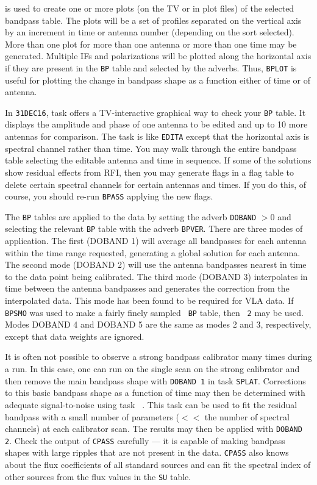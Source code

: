      {\tt {}} is used to create one or more plots (on the TV
or in plot files) of the selected bandpass table.  The plots will be a
set of profiles separated on the vertical axis by an increment in time
or antenna number (depending on the sort selected).  More than one
plot for more than one antenna or more than one time may be generated.
Multiple IFs and polarizations will be plotted along the horizontal
axis if they are present in the {\tt BP} table and selected by the
adverbs.  Thus, {\tt BPLOT} is useful for plotting the change in
bandpass shape as a function either of time or of antenna.

     In {\tt 31DEC16}, task {\tt {}} offers a TV-interactive
graphical way to check your {\tt BP} table.  It displays the amplitude
and phase of one antenna to be edited and up to 10 more antennas for
comparison.  The task is like {\tt EDITA} except that the horizontal
axis is spectral channel rather than time.  You may walk through the
entire bandpass table selecting the editable antenna and time in
sequence.  If some of the solutions show residual effects from RFI,
then you may generate flags in a flag table to delete certain spectral
channels for certain antennas and times.  If you do this, of course,
you should re-run {\tt BPASS} applying the new flags.

     The {\tt BP} tables are applied to the data by setting the adverb
{\tt DOBAND} $> 0$ and selecting the relevant {\tt BP} table with the
adverb \hbox{{\tt BPVER}}.  There are three modes of 
application.  The first ({\us DOBAND 1}) will average all bandpasses
for each antenna within the time range requested, generating a global
solution for each antenna.  The second mode ({\us DOBAND 2}) will use
the antenna bandpasses nearest in time to the data point being
calibrated.  The third mode ({\us DOBAND 3}) interpolates in time
between the antenna bandpasses and generates the correction from the
interpolated data.  This mode has been found to be required for VLA
data.  If {\tt BPSMO} was used to make a fairly finely sampled {\tt
BP} table, then {\tt {} 2} may be used.  Modes {\us DOBAND
4} and {\us DOBAND 5} are the same as modes 2 and 3, respectively,
except that data weights are ignored.

     It is often not possible to observe a strong bandpass calibrator
many times during a run.  In this case, one can run {\tt {}}
on the single scan on the strong calibrator and then remove the main
bandpass shape with {\tt DOBAND 1} in task {\tt SPLAT}\@.  Corrections
to this basic bandpass shape as a function of time may then be
determined with adequate signal-to-noise using task {\tt
{}}\@.  This task can be used to fit the residual bandpass
with a small number of parameters ($<<$ the number of spectral
channels) at each calibrator scan.  The results may then be applied
with {\tt DOBAND 2}\@.  Check the output of {\tt CPASS} carefully ---
it is capable of making bandpass shapes with large ripples that are
not present in the data.  {\tt CPASS} also knows about the flux
coefficients of all standard sources and can fit the spectral index of
other sources from the flux values in the {\tt SU} table.


